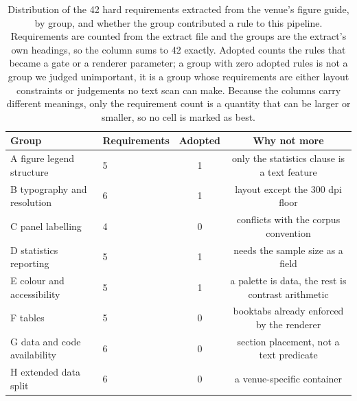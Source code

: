 \begin{table}[t]
\centering
\caption{Distribution of the 42 hard requirements extracted from the venue's figure guide, by group, and whether the group contributed a rule to this pipeline. Requirements are counted from the extract file and the groups are the extract's own headings, so the column sums to 42 exactly. Adopted counts the rules that became a gate or a renderer parameter; a group with zero adopted rules is not a group we judged unimportant, it is a group whose requirements are either layout constraints or judgements no text scan can make. Because the columns carry different meanings, only the requirement count is a quantity that can be larger or smaller, so no cell is marked as best.}
\label{tab:tab-nature-groups}
\begin{tabular}{llcc}
\toprule
\textbf{Group} & \textbf{Requirements} & \textbf{Adopted} & \textbf{Why not more} \\
\midrule
A figure legend structure & 5 & 1 & only the statistics clause is a text feature \\
B typography and resolution & 6 & 1 & layout except the 300 dpi floor \\
C panel labelling & 4 & 0 & conflicts with the corpus convention \\
D statistics reporting & 5 & 1 & needs the sample size as a field \\
E colour and accessibility & 5 & 1 & a palette is data, the rest is contrast arithmetic \\
F tables & 5 & 0 & booktabs already enforced by the renderer \\
G data and code availability & 6 & 0 & section placement, not a text predicate \\
H extended data split & 6 & 0 & a venue-specific container \\
\bottomrule
\end{tabular}
\end{table}
